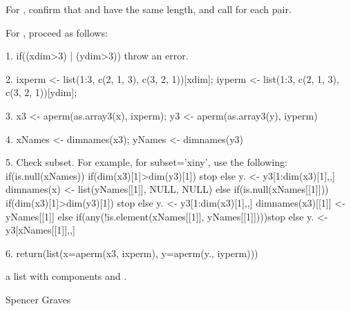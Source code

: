 \documentclass{article}
\begin{document}
\begin{Details}\relax
For , confirm that  and  have
the same length, and call  for each pair.  

For , proceed as follows:

1.  if((xdim>3) | (ydim>3)) throw an error.

2.  ixperm <- list(1:3, c(2, 1, 3), c(3, 2, 1))[xdim];
iyperm <- list(1:3, c(2, 1, 3), c(3, 2, 1))[ydim];

3.  x3 <- aperm(as.array3(x), ixperm);
y3 <- aperm(as.array3(y), iyperm) 

4.  xNames <- dimnames(x3);  yNames <- dimnames(y3) 

5.  Check subset.  For example, for subset='xiny', use the following:
if(is.null(xNames)){
if(dim(x3)[1]>dim(y3)[1]) stop
else y. <- y3[1:dim(x3)[1],,]
dimnames(x) <- list(yNames[[1]], NULL, NULL) 
}
else {
if(is.null(xNames[[1]])){
if(dim(x3)[1]>dim(y3)[1]) stop
else y. <- y3[1:dim(x3)[1],,]
dimnames(x3)[[1]] <- yNames[[1]]
}
else {
if(any(!is.element(xNames[[1]], yNames[[1]])))stop
else y. <- y3[xNames[[1]],,]
}
}

6.  return(list(x=aperm(x3, ixperm), y=aperm(y., iyperm)))
\end{Details}
\begin{Value}
a list with components  and .
\end{Value}
\begin{Author}\relax
Spencer Graves
\end{Author}
\begin{SeeAlso}\relax
{}
\end{SeeAlso}
\end{document}
